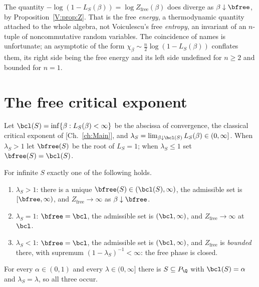 \begin{remark}\label{V:rem:freeenergy}
The quantity $-\log(1-L_S(\beta))=\log Z_{\mathrm{free}}(\beta)$ does diverge as
$\beta\downarrow\bfree$, by Proposition~\ref{V:prop:Z}. That is the free \emph{energy}, a
thermodynamic quantity attached to the whole algebra, not Voiculescu's free \emph{entropy},
an invariant of an $n$-tuple of noncommutative random variables. The coincidence of names is
unfortunate; an asymptotic of the form $\chi_\beta\sim\frac n2\log(1-L_S(\beta))$ conflates
them, its right side being the free energy and its left side undefined for $n\ge2$ and
bounded for $n=1$.
\end{remark}

\section{The free critical exponent}

\begin{definition}\label{V:def:bfree}
Let $\bcl(S)=\inf\{\beta:L_S(\beta)<\infty\}$ be the abscissa of convergence, the classical
critical exponent of [Ch.~\ref{ch:Main}], and
$\lambda_S=\lim_{\beta\downarrow\bcl(S)}L_S(\beta)\in(0,\infty]$. When $\lambda_S>1$ let
$\bfree(S)$ be the root of $L_S=1$; when $\lambda_S\le1$ set $\bfree(S)=\bcl(S)$.
\end{definition}

\begin{theorem}[Trichotomy]\label{V:thm:trich}
For infinite $S$ exactly one of the following holds.
\begin{enumerate}
\item[\textup{(S)}] $\lambda_S>1$: there is a unique $\bfree(S)\in(\bcl(S),\infty)$, the
admissible set is $[\bfree,\infty)$, and $Z_{\mathrm{free}}\to\infty$ as
$\beta\downarrow\bfree$.
\item[\textup{(C)}] $\lambda_S=1$: $\bfree=\bcl$, the admissible set is $(\bcl,\infty)$, and
$Z_{\mathrm{free}}\to\infty$ at $\bcl$.
\item[\textup{(B)}] $\lambda_S<1$: $\bfree=\bcl$, the admissible set is $(\bcl,\infty)$, and
$Z_{\mathrm{free}}$ is \emph{bounded} there, with supremum $(1-\lambda_S)^{-1}<\infty$: the
free phase is closed.
\end{enumerate}
For every $\alpha\in(0,1)$ and every $\lambda\in(0,\infty]$ there is $S\subseteq P_\Q$ with
$\bcl(S)=\alpha$ and $\lambda_S=\lambda$, so all three occur.
\end{theorem}

